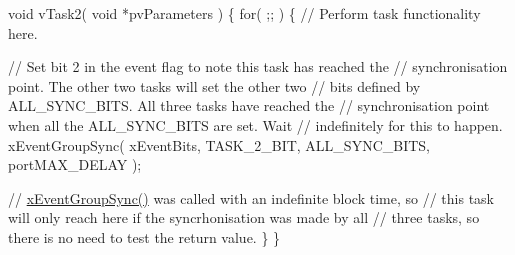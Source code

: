 \begin{DoxyPre}void vTask2( void *pvParameters )
\{
    for( ;; )
    \{
    // Perform task functionality here.\end{DoxyPre}



\begin{DoxyPre}    // Set bit 2 in the event flag to note this task has reached the
    // synchronisation point.  The other two tasks will set the other two
    // bits defined by ALL\_SYNC\_BITS.  All three tasks have reached the
    // synchronisation point when all the ALL\_SYNC\_BITS are set.  Wait
    // indefinitely for this to happen.
    xEventGroupSync( xEventBits, TASK\_2\_BIT, ALL\_SYNC\_BITS, portMAX\_DELAY );\end{DoxyPre}



\begin{DoxyPre}    // \mbox{\hyperlink{event__groups_8h_a869511456b86426f52e2eec898bff341}{xEventGroupSync()}} was called with an indefinite block time, so
    // this task will only reach here if the syncrhonisation was made by all
    // three tasks, so there is no need to test the return value.
   \}
\}\end{DoxyPre}



\begin{DoxyPre}\end{DoxyPre}
 